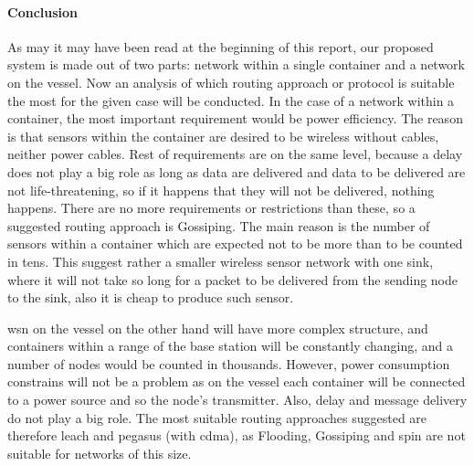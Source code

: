 \paragraph{Conclusion}
As may it may have been read at the beginning of this report, our proposed system is made out of two parts: network within a single container and a network on the vessel. Now an analysis of which routing approach or protocol is suitable the most for the given case will be conducted. 
In the case of a network within a container, the most important requirement would be power efficiency. The reason is that sensors within the container are desired to be wireless without cables, neither power cables. Rest of requirements are on the same level, because a delay does not play a big role as long as data are delivered and data to be delivered are not life-threatening, so if it happens that they will not be delivered, nothing happens. There are no more requirements or restrictions than these, so a suggested routing approach is Gossiping. The main reason is the number of sensors within a container which are expected not to be more than to be counted in tens. This suggest rather a smaller wireless sensor network with one sink, where it will not take so long for a packet to be delivered from the sending node to the sink, also it is cheap to produce such sensor.

\acrshort{wsn} on the vessel on the other hand will have more complex structure, and containers within a range of the base station will be constantly changing, and a number of nodes would be counted in thousands. However, power consumption constrains will not be a problem as on the vessel each container will be connected to a power source and so the node’s transmitter. Also, delay and message delivery do not play a big role. The most suitable routing approaches suggested are therefore \acrshort{leach} and \acrshort{pegasus} (with \acrshort{cdma}), as Flooding, Gossiping and \acrshort{spin} are not suitable for networks of this size.


